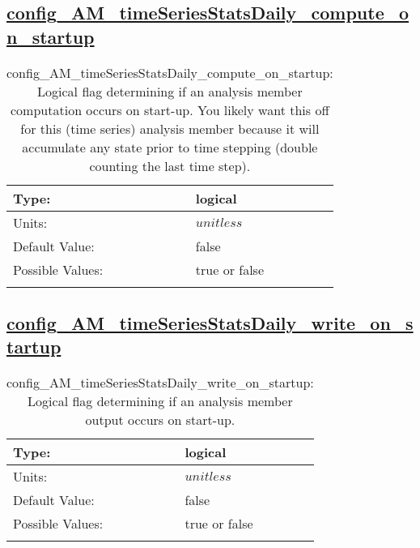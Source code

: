 \subsection[config\_AM\_timeSeriesStatsDaily\_compute\_on\_startup]{\hyperref[sec:nm_tab_AM_timeSeriesStatsDaily]{config\_AM\_timeSeriesStatsDaily\_compute\_on\_startup}}
\label{subsec:nm_sec_config_AM_timeSeriesStatsDaily_compute_on_startup}
\begin{center}
\begin{longtable}{| p{2.0in} || p{4.0in} |}
    \hline
    Type: & logical \\
    \hline
    Units: & $unitless$ \\
    \hline
    Default Value: & false \\
    \hline
    Possible Values: & true or false \\
    \hline
    \caption{config\_AM\_timeSeriesStatsDaily\_compute\_on\_startup: Logical flag determining if an analysis member computation occurs on start-up. You likely want this off for this (time series) analysis member because it will accumulate any state prior to time stepping (double counting the last time step).}
\end{longtable}
\end{center}
\subsection[config\_AM\_timeSeriesStatsDaily\_write\_on\_startup]{\hyperref[sec:nm_tab_AM_timeSeriesStatsDaily]{config\_AM\_timeSeriesStatsDaily\_write\_on\_startup}}
\label{subsec:nm_sec_config_AM_timeSeriesStatsDaily_write_on_startup}
\begin{center}
\begin{longtable}{| p{2.0in} || p{4.0in} |}
    \hline
    Type: & logical \\
    \hline
    Units: & $unitless$ \\
    \hline
    Default Value: & false \\
    \hline
    Possible Values: & true or false \\
    \hline
    \caption{config\_AM\_timeSeriesStatsDaily\_write\_on\_startup: Logical flag determining if an analysis member output occurs on start-up.}
\end{longtable}
\end{center}

